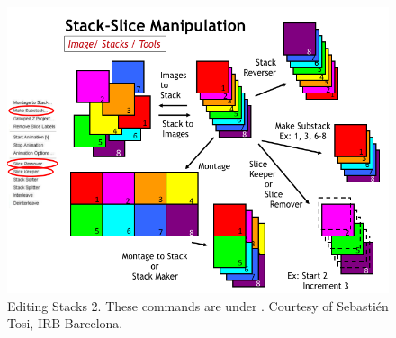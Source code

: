 \begin{figure}[hbtp]
\begin{center}
\includegraphics[width=\textwidth]{fig/stackEditing2.png}
\caption{Editing Stacks 2. These commands are under . Courtesy of Sebasti\'{e}n Tosi, IRB Barcelona.}
\label{fig:editStack2}
\end{center}
\end{figure}


